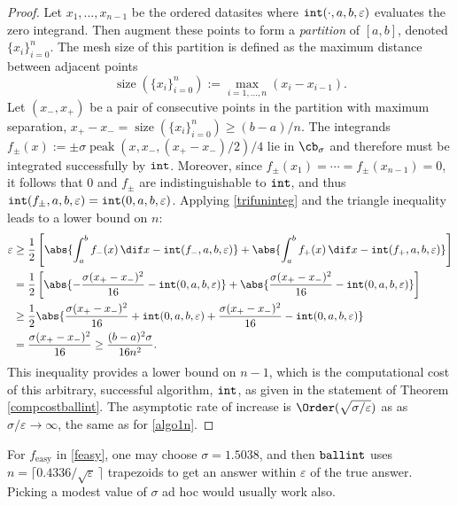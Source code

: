 \documentclass[]{article}
\DeclareMathOperator{\goodinteg}{\texttt{\textup{int}}}
\DeclareMathOperator{\ballinteg}{\texttt{\textup{ballint}}}
\DeclareMathOperator{\size}{size}
\theoremstyle{definition}
\theoremstyle{remark}
\DeclareMathOperator{\tri}{peak}
\newcommand{\datasites}{\{x_i\}_{i=0}^n}
\begin{document}
\begin{proof}
Let $x_1, \ldots, x_{n-1}$ be the ordered datasites where $\goodinteg(\cdot,a,b,\varepsilon)$ evaluates the zero integrand.  Then augment these points to form a \emph{partition} of $[a,b]$, denoted  $\datasites$. The mesh size of this partition is defined as the maximum distance between adjacent points
\begin{equation}
\size(\datasites):= \max_{i=1, \dots, n} (x_i - x_{i-1}).
\end{equation}
Let $(x_-,x_+)$ be a pair of consecutive points in the partition with maximum separation, $x_+ -x_- = \size(\datasites) \ge (b-a)/n$.  The integrands $f_{\pm}(x) := \pm \sigma \tri(x,x_-,(x_+-x_-)/2)/4$ lie in $\cb_\sigma$ and therefore must be integrated successfully by $\goodinteg$.  Moreover, since $f_{\pm}(x_1)=\cdots = f_{\pm}(x_{n-1}) = 0$, it follows that $0$ and $f_{\pm}$ are indistinguishable to $\goodinteg$, and thus 
$\goodinteg(f_\pm,a,b,\varepsilon)=\goodinteg(0,a,b,\varepsilon)$.  
Applying \eqref{trifuninteg} and the triangle inequality leads to a lower bound on $n$: 
\begin{align*}
\varepsilon & \ge \frac{1}{2}\left [ \abs{\int_a^b f_-(x) \, \dif x - \goodinteg(f_-,a,b,\varepsilon)} + \abs{\int_a^b f_+(x) \, \dif x - \goodinteg(f_+,a,b,\varepsilon)} \right] \\
& = \frac{1}{2}\left [ \abs{-\frac{\sigma (x_+ -x_-)^2}{16}- \goodinteg(0,a,b,\varepsilon)} + \abs{\frac{\sigma( x_+-x_-)^2}{16} - \goodinteg(0,a,b,\varepsilon)} \right]\\
& \ge \frac{1}{2} \abs{\frac{\sigma ( x_+-x_-)^2}{16}+ \goodinteg(0,a,b,\varepsilon) + \frac{\sigma( x_+-x_-)^2}{16} - \goodinteg(0,a,b,\varepsilon)} \\
& = \frac{\sigma( x_+-x_-)^2}{16} \ge \frac{(b-a)^2 \sigma}{16 n^2 }.
\end{align*}
This inequality provides a lower bound on $n-1$, which is the computational cost of this arbitrary, successful algorithm, $\goodinteg$, as given in the statement of Theorem \ref{compcostballint}.  The asymptotic rate of increase is $\Order(\sqrt{\sigma/\varepsilon})$ as as $\sigma/\varepsilon \to \infty$, the same as for \eqref{algo1n}.
\end{proof}

For $f_{\text{easy}}$ in \eqref{feasy}, one may choose $\sigma=1.5038$, and then $\ballinteg$ uses $n = \lceil 0.4336/\sqrt{\varepsilon}\, \rceil$ trapezoids to get an answer within $\varepsilon$ of the true answer. Picking a modest value of $\sigma$ ad hoc would usually work also.  
\end{document}
